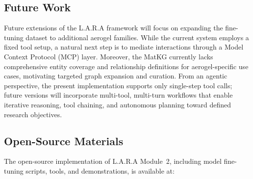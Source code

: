 \subsection*{Future Work}

Future extensions of the L.A.R.A framework will focus on expanding the fine-tuning dataset to additional aerogel families. While the current system employs a fixed tool setup, a natural next step is to mediate interactions through a Model Context Protocol (MCP) layer. Moreover, the MatKG currently lacks comprehensive entity coverage and relationship definitions for aerogel-specific use cases, motivating targeted graph expansion and curation. From an agentic perspective, the present implementation supports only single-step tool calls; future versions will incorporate multi-tool, multi-turn workflows that enable iterative reasoning, tool chaining, and autonomous planning toward defined research objectives.

\subsection*{Open-Source Materials}

The open-source implementation of L.A.R.A Module~2, including model fine-tuning scripts, tools, and demonstrations, is available at: 









